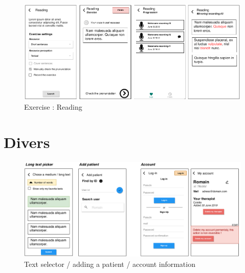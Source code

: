 \begin{appendices}
\begin{figure}[H]
  \includegraphics[width=1\linewidth]{content/imgs/maquette2d.png}
  \caption*{Exercise : Reading}
\end{figure}

\section{Divers}
\begin{figure}[H]
  \includegraphics[width=1\linewidth]{content/imgs/maquette3.png}
  \caption*{Text selector / adding a patient / account information}
\end{figure}






\begin{landscape}

\end{landscape}
\end{appendices}
